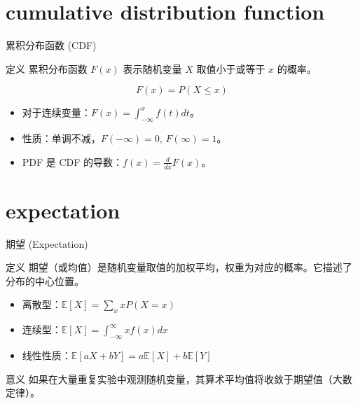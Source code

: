 \documentclass[12pt, t, aspectratio=169]{beamer}
\newcommand{\E}{\mathbb{E}}
\begin{document}
\section{cumulative distribution function}
\begin{frame}{累积分布函数 (CDF)}
    \begin{block}{定义}
        累积分布函数 $F(x)$ 表示随机变量 $X$ 取值小于或等于 $x$ 的概率。
    \end{block}
    
    \begin{equation*}
        F(x) = P(X \leq x)
    \end{equation*}
    
    \vspace{0.5cm}
    \begin{itemize}
        \item 对于连续变量：$F(x) = \int_{-\infty}^{x} f(t) dt$。
        \item 性质：单调不减，$F(-\infty)=0$, $F(\infty)=1$。
        \item PDF 是 CDF 的导数：$f(x) = \frac{d}{dx}F(x)$。
    \end{itemize}
\end{frame}

\section{expectation}
\begin{frame}{期望 (Expectation)}
    \begin{block}{定义}
        期望（或均值）是随机变量取值的加权平均，权重为对应的概率。它描述了分布的中心位置。
    \end{block}
    
    \begin{itemize}
        \item 离散型：$\E[X] = \sum_{x} x P(X=x)$
        \item 连续型：$\E[X] = \int_{-\infty}^{\infty} x f(x) dx$
        \item 线性性质：$\E[aX + bY] = a\E[X] + b\E[Y]$
    \end{itemize}
    
    \vspace{0.2cm}
    \begin{exampleblock}{意义}
        如果在大量重复实验中观测随机变量，其算术平均值将收敛于期望值（大数定律）。
    \end{exampleblock}
\end{frame}
\end{document}
